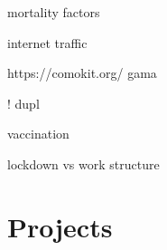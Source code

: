 \documentclass[10pt]{article}
\begin{document}
\cite{williamson2020opensafely} mortality factors

\cite{feldmann2020lockdown} internet traffic

https://comokit.org/ gama \cite{gaudou2020comokit}

\cite{murphy2020inside}

\cite{pullano2020underdetection}

\cite{mallapaty2020what}

\cite{Schlosser32883}

\cite{trump2020combine}

\cite{pullano2020underdetection} ! dupl

\cite{mallapaty2021covid} vaccination

\cite{heroy2020controlling} lockdown vs work structure


\section{Projects}
\end{document}
